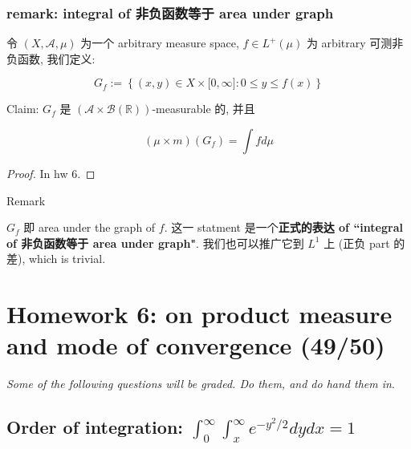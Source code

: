 \documentclass{qlnotes-export}
\begin{document}
\subsection{remark: integral of 非负函数等于 area under graph}\label{remark-integral-of-ux975eux8d1fux51fdux6570ux7b49ux4e8e-area-under-graph}

\begin{theorem}\label{thm-06-product-measure-fubini-tonelli-theorem-005}

令 \((X,\mathcal{A},\mu)\) 为一个 arbitrary measure space, \(f \in L^{+}(\mu)\) 为 arbitrary 可测非负函数, 我们定义:

\[G_{f} := \left\{ {(x,y) \in X \times \lbrack 0,\infty\rbrack:0 \leq y \leq f(x)} \right\}\]

Claim: \(G_{f}\) 是 \((\mathcal{A} \times \mathcal{B}({\mathbb{R}}))\)-measurable 的, 并且

\[(\mu \times m)(G_{f}) = \int f d\mu\]

\end{theorem}

\begin{proof}

In hw 6.

\end{proof}

\begin{qlremark}{Remark}

\(G_{f}\) 即 area under the graph of \(f\). 这一 statment 是一个\textbf{正式的表达 of ``integral of 非负函数等于 area under graph"}. 我们也可以推广它到 \(L^{1}\) 上 (正负 part 的差), which is trivial.

\end{qlremark}

\chapter{Homework 6: on product measure and mode of convergence (49/50)}\label{homework-6-on-product-measure-and-mode-of-convergence-4950}

\emph{Some of the following questions will be graded. Do them, and do hand them in}.

\section{\texorpdfstring{Order of integration: \(\int_{0}^{\infty}\int_{x}^{\infty}e^{- y^{2}/2} dy dx = 1\)}{Order of integration: \textbackslash int\_\{0\}\^{}\{\textbackslash infty\}\textbackslash int\_\{x\}\^{}\{\textbackslash infty\}e\^{}\{- y\^{}\{2\}/2\} dy dx = 1}}\label{order-of-integration-int_0inftyint_xinfty-e-y22d-y-d-x1}
\end{document}
